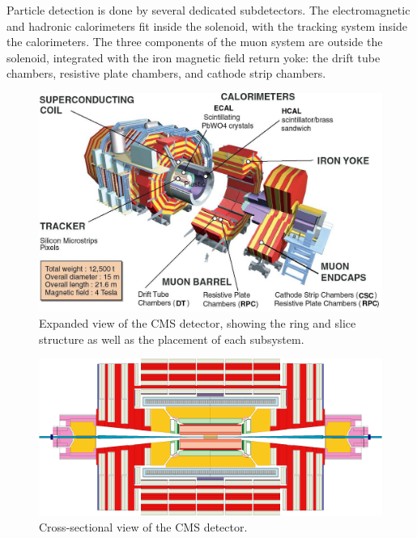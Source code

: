Particle detection is done by several dedicated subdetectors.  
The electromagnetic and hadronic calorimeters fit inside the solenoid, 
with the tracking system inside the calorimeters.  
The three components of the muon system are outside the solenoid,
integrated with the iron magnetic field return yoke:
the drift tube chambers, resistive plate chambers,
and cathode strip chambers.  


 \begin{figure}[htb]
  \begin{center}
    \includegraphics[width=360pt]{Figures/CMSncLabels.png}
  \end{center}
  \caption[\fixspacing Expanded view of the CMS detector]
	  {\fixspacing Expanded view of the CMS detector, showing the ring and slice structure as well as the placement of each subsystem.}
  \label{fig:CMSDiagram3D}
 \end{figure}

 \begin{figure}[htb]
  \begin{center}
    \includegraphics[width=360pt]{Figures/Longnc.png}
  \end{center}
  \caption[\fixspacing Cross-sectional view of the CMS detector]
	  {\fixspacing Cross-sectional view of the CMS detector.}
  \label{fig:CMSDiagramFlat}
 \end{figure}

